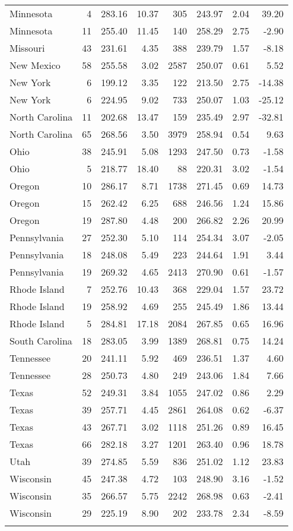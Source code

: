 \begin{longtable}{lrrr@{\extracolsep{10pt}}rrrr}
  Minnesota &   4 & 283.16 & 10.37 & 305 & 243.97 & 2.04 & 39.20 \\ 
  Minnesota &  11 & 255.40 & 11.45 & 140 & 258.29 & 2.75 & -2.90 \\ 
  Missouri &  43 & 231.61 & 4.35 & 388 & 239.79 & 1.57 & -8.18 \\ 
  New Mexico &  58 & 255.58 & 3.02 & 2587 & 250.07 & 0.61 & 5.52 \\ 
  New York &   6 & 199.12 & 3.35 & 122 & 213.50 & 2.75 & -14.38 \\ 
  New York &   6 & 224.95 & 9.02 & 733 & 250.07 & 1.03 & -25.12 \\ 
  North Carolina &  11 & 202.68 & 13.47 & 159 & 235.49 & 2.97 & -32.81 \\ 
  North Carolina &  65 & 268.56 & 3.50 & 3979 & 258.94 & 0.54 & 9.63 \\ 
  Ohio &  38 & 245.91 & 5.08 & 1293 & 247.50 & 0.73 & -1.58 \\ 
  Ohio &   5 & 218.77 & 18.40 &  88 & 220.31 & 3.02 & -1.54 \\ 
  Oregon &  10 & 286.17 & 8.71 & 1738 & 271.45 & 0.69 & 14.73 \\ 
  Oregon &  15 & 262.42 & 6.25 & 688 & 246.56 & 1.24 & 15.86 \\ 
  Oregon &  19 & 287.80 & 4.48 & 200 & 266.82 & 2.26 & 20.99 \\ 
  Pennsylvania &  27 & 252.30 & 5.10 & 114 & 254.34 & 3.07 & -2.05 \\ 
  Pennsylvania &  18 & 248.08 & 5.49 & 223 & 244.64 & 1.91 & 3.44 \\ 
  Pennsylvania &  19 & 269.32 & 4.65 & 2413 & 270.90 & 0.61 & -1.57 \\ 
  Rhode Island &   7 & 252.76 & 10.43 & 368 & 229.04 & 1.57 & 23.72 \\ 
  Rhode Island &  19 & 258.92 & 4.69 & 255 & 245.49 & 1.86 & 13.44 \\ 
  Rhode Island &   5 & 284.81 & 17.18 & 2084 & 267.85 & 0.65 & 16.96 \\ 
  South Carolina &  18 & 283.05 & 3.99 & 1389 & 268.81 & 0.75 & 14.24 \\ 
  Tennessee &  20 & 241.11 & 5.92 & 469 & 236.51 & 1.37 & 4.60 \\ 
  Tennessee &  28 & 250.73 & 4.80 & 249 & 243.06 & 1.84 & 7.66 \\ 
  Texas &  52 & 249.31 & 3.84 & 1055 & 247.02 & 0.86 & 2.29 \\ 
  Texas &  39 & 257.71 & 4.45 & 2861 & 264.08 & 0.62 & -6.37 \\ 
  Texas &  43 & 267.71 & 3.02 & 1118 & 251.26 & 0.89 & 16.45 \\ 
  Texas &  66 & 282.18 & 3.27 & 1201 & 263.40 & 0.96 & 18.78 \\ 
  Utah &  39 & 274.85 & 5.59 & 836 & 251.02 & 1.12 & 23.83 \\ 
  Wisconsin &  45 & 247.38 & 4.72 & 103 & 248.90 & 3.16 & -1.52 \\ 
  Wisconsin &  35 & 266.57 & 5.75 & 2242 & 268.98 & 0.63 & -2.41 \\ 
  Wisconsin &  29 & 225.19 & 8.90 & 202 & 233.78 & 2.34 & -8.59 \\ 
   \hline
\hline
\label{g8readingtreelevel1}
\end{longtable}
